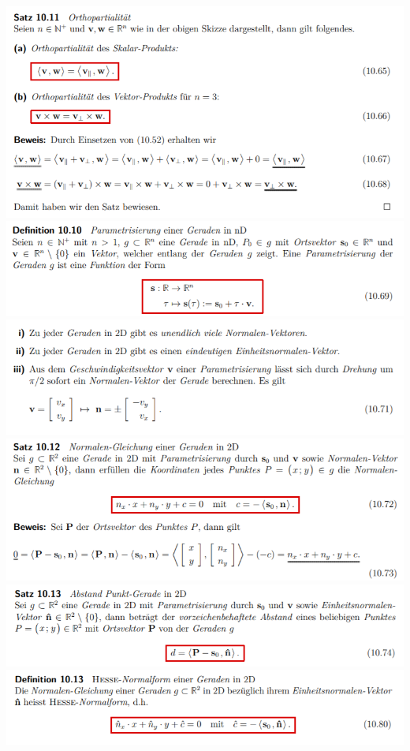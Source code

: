 \includegraphics[width=\columnwidth]{./images/vek23.png}
\includegraphics[width=\columnwidth]{./images/vek24.png}
\includegraphics[width=\columnwidth]{./images/vek25.png}
\includegraphics[width=\columnwidth]{./images/vek26.png}
\includegraphics[width=\columnwidth]{./images/vek27.png}
\includegraphics[width=\columnwidth]{./images/vek28.png}
